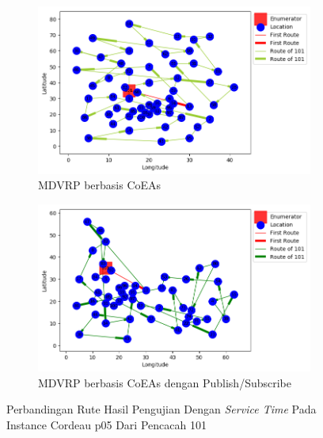 \begin{figure}[H]
	\centering
	\begin{subfigure}[t]{\textwidth}
		\centering
		\includegraphics[width=\textwidth]{Resources/Images/cordeau_p05_tw/cordeau_p05_tw_101_coes}
		\caption{MDVRP berbasis CoEAs}
		\label{fig:cordeau_p05_tw_101_coes}
	\end{subfigure}
	\begin{subfigure}[t]{\textwidth}
		\centering
		\includegraphics[width=\textwidth]{Resources/Images/cordeau_p05_tw/cordeau_p05_tw_101_pubsub_coes}
		\caption{MDVRP berbasis CoEAs dengan Publish/Subscribe}
		\label{fig:cordeau_p05_tw_101_pubsub_coes}
	\end{subfigure}
	\caption{Perbandingan Rute Hasil Pengujian Dengan \textit{Service Time} Pada Instance Cordeau p05 Dari Pencacah 101}
	\label{fig:cordeau_p05_tw_101}
\end{figure}


